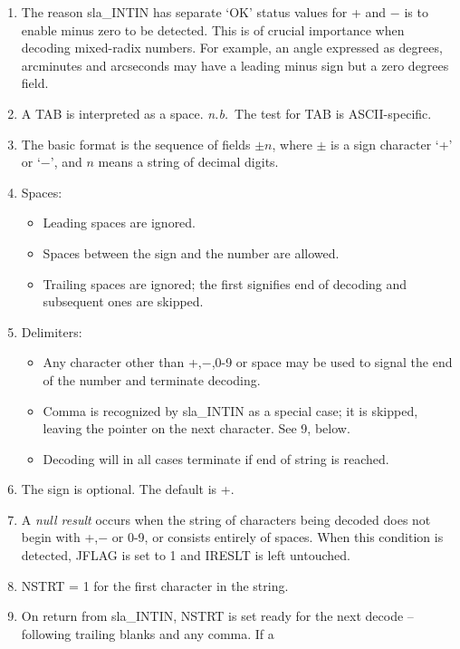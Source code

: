 \documentclass[11pt,twoside,nolof]{starlink}
\begin{document}
{
 \begin{enumerate}
 \item The reason sla\_INTIN has separate `OK' status values
       for + and $-$ is to enable minus zero to be detected.
       This is of crucial importance
       when decoding mixed-radix numbers.  For example, an angle
       expressed as degrees, arcminutes and arcseconds may have a
       leading minus sign but a zero degrees field.
 \item A TAB is interpreted as a space. \textit{n.b.}\ The test for TAB is
       ASCII-specific.
 \item The basic format is the sequence of fields $\pm n$,
       where $\pm$ is a sign
       character `+' or `$-$', and $n$ means a string of decimal digits.
 \item Spaces:
       \begin{itemize}
       \item Leading spaces are ignored.
       \item Spaces between the sign and the number are allowed.
       \item Trailing spaces are ignored;  the first signifies
             end of decoding and subsequent ones are skipped.
       \end{itemize}
 \item Delimiters:
       \begin{itemize}
       \item Any character other than +,$-$,0-9 or space may be
             used to signal the end of the number and terminate decoding.
       \item Comma is recognized by sla\_INTIN as a special case; it
             is skipped, leaving the pointer on the next character.  See
             9, below.
       \item Decoding will in all cases terminate if end of string
             is reached.
       \end{itemize}
 \item The sign is optional.  The default is +.
 \item A \textit{null result}\/ occurs when the string of characters
       being decoded does not begin with +,$-$ or 0-9, or
       consists entirely of spaces.  When this condition is
       detected, JFLAG is set to 1 and IRESLT is left untouched.
 \item NSTRT = 1 for the first character in the string.
 \item On return from sla\_INTIN, NSTRT is set ready for the next
       decode -- following trailing blanks and any comma.  If a

\end{enumerate}}
\end{document}
